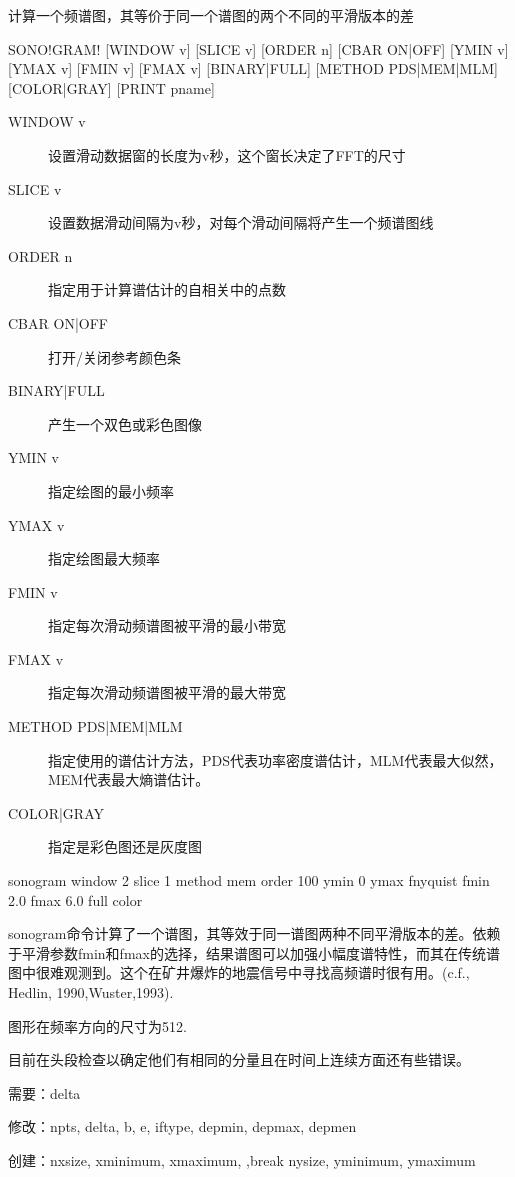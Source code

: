 \label{cmd:sonogram}

计算一个频谱图，其等价于同一个谱图的两个不同的平滑版本的差

\begin{SACSTX}
SONO!GRAM! [WINDOW v] [SLICE v] [ORDER n] [CBAR ON|OFF] 
    [YMIN v] [YMAX v] [FMIN v] [FMAX v] [BINARY|FULL] 
    [METHOD PDS|MEM|MLM] [COLOR|GRAY] [PRINT pname]
\end{SACSTX}

\begin{description}
\item [WINDOW v] 设置滑动数据窗的长度为v秒，这个窗长决定了FFT的尺寸 
\item [SLICE v] 设置数据滑动间隔为v秒，对每个滑动间隔将产生一个频谱图线 
\item [ORDER n] 指定用于计算谱估计的自相关中的点数 
\item [CBAR ON|OFF] 打开/关闭参考颜色条 
\item [BINARY|FULL] 产生一个双色或彩色图像 
\item [YMIN v] 指定绘图的最小频率  
\item [YMAX v] 指定绘图最大频率 
\item [FMIN v] 指定每次滑动频谱图被平滑的最小带宽 
\item [FMAX v] 指定每次滑动频谱图被平滑的最大带宽  
\item [METHOD PDS|MEM|MLM] 指定使用的谱估计方法，PDS代表功率密度谱估计，MLM代表最大似然，MEM代表最大熵谱估计。 
\item [COLOR|GRAY] 指定是彩色图还是灰度图 
\end{description}
 
\begin{SACDFT}
sonogram window 2 slice 1 method mem order 100 ymin 0 ymax 	
    fnyquist fmin 2.0 fmax 6.0 full color
\end{SACDFT}

sonogram命令计算了一个谱图，其等效于同一谱图两种不同平滑版本的差。依赖于平滑参数fmin和fmax的选择，结果谱图可以加强小幅度谱特性，而其在传统谱图中很难观测到。这个在矿井爆炸的地震信号中寻找高频谱时很有用。(c.f., Hedlin, 1990,Wuster,1993).

图形在频率方向的尺寸为512.

目前在头段检查以确定他们有相同的分量且在时间上连续方面还有些错误。

需要：delta

修改：npts, delta, b, e, iftype, depmin, depmax, depmen

创建：nxsize, xminimum, xmaximum, ,break nysize, yminimum, ymaximum
